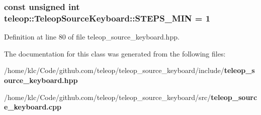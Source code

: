 \subsubsection[{STEPS\_\-MIN}]{\setlength{\rightskip}{0pt plus 5cm}const unsigned int {\bf teleop::TeleopSourceKeyboard::STEPS\_\-MIN} = 1\hspace{0.3cm}{\ttfamily  [static]}}\label{classteleop_1_1TeleopSourceKeyboard_a13a423ce5ce0d7358f9c6b5d0d820dde}


Definition at line 80 of file teleop\_\-source\_\-keyboard.hpp.



The documentation for this class was generated from the following files:\begin{DoxyCompactItemize}
\item 
/home/klc/Code/github.com/teleop/teleop\_\-source\_\-keyboard/include/{\bf teleop\_\-source\_\-keyboard.hpp}\item 
/home/klc/Code/github.com/teleop/teleop\_\-source\_\-keyboard/src/{\bf teleop\_\-source\_\-keyboard.cpp}\end{DoxyCompactItemize}
